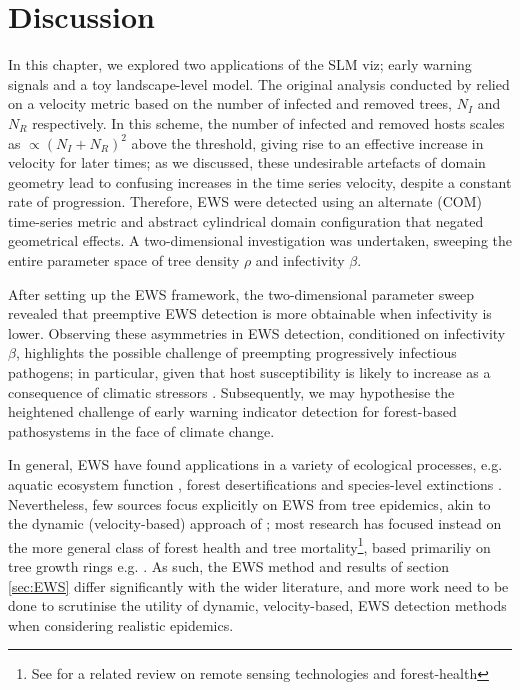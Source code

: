 \newpage

\section{Discussion}

In this chapter, we explored two applications of the SLM viz; early warning signals and a toy landscape-level model.
The original analysis conducted by \cite{OROZCOFUENTES201912} relied on a velocity metric based on the number of 
infected and removed trees, $N_I$ and $N_R$ respectively. In this scheme, the number of infected and removed hosts scales as
$\propto (N_I + N_R)^2$ above the threshold, giving rise to an effective increase in velocity for later times;
as we discussed, these undesirable artefacts of domain geometry lead to confusing increases in the time series velocity, 
despite a constant rate of progression. Therefore, EWS were detected using an alternate (COM) time-series metric and abstract 
cylindrical domain configuration that negated geometrical effects.
A two-dimensional investigation was undertaken, sweeping the entire parameter space of tree density $\rho$ and infectivity $\beta$.

After setting up the EWS framework, the two-dimensional parameter sweep revealed that preemptive EWS detection is more obtainable 
when infectivity is lower. Observing these asymmetries in EWS detection, conditioned on infectivity
$\beta$, highlights the possible challenge of preempting progressively infectious pathogens;
in particular, given that host susceptibility is likely to increase as a consequence of climatic stressors \cite{garrett2006climate}.
Subsequently, we may hypothesise the heightened challenge of early warning indicator detection for forest-based pathosystems in the face of climate change.

In general, EWS have found applications in a variety of ecological processes, 
e.g. aquatic ecosystem function \cite{kramer1991aquatic}, forest desertifications \cite{yang2005desertification}
and species-level extinctions \cite{drake2010early}.
Nevertheless, few sources focus explicitly on EWS from tree epidemics, akin to the dynamic (velocity-based) 
approach of \cite{OROZCOFUENTES201912}; most research has focused instead on the more general class of forest
health and tree mortality\footnote{ 
See \cite{torres2021role} for a related review on remote sensing technologies and forest-health
}, based primariliy on tree growth rings e.g. \cite{mamet2015tree, rogers2018detecting}. 
As such, the EWS method and results of section \ref{sec:EWS} differ significantly with the wider literature,
and more work need to be done to scrutinise the utility of dynamic, velocity-based, EWS detection methods when
considering realistic epidemics.

